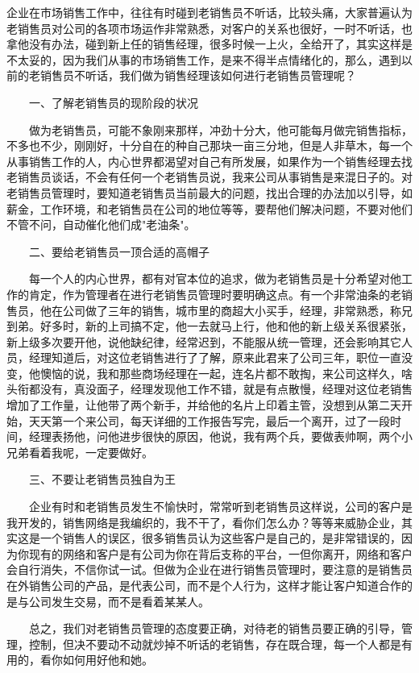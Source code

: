 
    企业在市场销售工作中，往往有时碰到老销售员不听话，比较头痛，大家普遍认为老销售员对公司的各项市场运作非常熟悉，对客户的关系也很好，一时不听话，也拿他没有办法，碰到新上任的销售经理，很多时候一上火，全给开了，其实这样是不太妥的，因为我们从事的市场销售工作，是来不得半点情绪化的，那么，遇到以前的老销售员不听话，我们做为销售经理该如何进行老销售员管理呢？

　　一、了解老销售员的现阶段的状况

　　做为老销售员，可能不象刚来那样，冲劲十分大，他可能每月做完销售指标，不多也不少，刚刚好，十分自在的种自己那块一亩三分地，但是人非草木，每一个从事销售工作的人，内心世界都渴望对自己有所发展，如果作为一个销售经理去找老销售员谈话，不会有任何一个老销售员说，我来公司从事销售是来混日子的。对老销售员管理时，要知道老销售员当前最大的问题，找出合理的办法加以引导，如薪金，工作环境，和老销售员在公司的地位等等，要帮他们解决问题，不要对他们不管不问，自动催化他们成"老油条"。

　　二、要给老销售员一顶合适的高帽子

　　每一个人的内心世界，都有对官本位的追求，做为老销售员是十分希望对他工作的肯定，作为管理者在进行老销售员管理时要明确这点。有一个非常油条的老销售员，他在公司做了三年的销售，城市里的商超大小买手，经理，非常熟悉，称兄到弟。好多时，新的上司搞不定，他一去就马上行，他和他的新上级关系很紧张，新上级多次要开他，说他缺纪律，经常迟到，不能服从统一管理，还会影响其它人员，经理知道后，对这位老销售进行了了解，原来此君来了公司三年，职位一直没变，他懊恼的说，我和那些商场经理在一起，连名片都不敢掏，来公司这样久，啥头衔都没有，真没面子，经理发现他工作不错，就是有点散慢，经理对这位老销售增加了工作量，让他带了两个新手，并给他的名片上印着主管，没想到从第二天开始，天天第一个来公司，每天详细的工作报告写完，最后一个离开，过了一段时间，经理表扬他，问他进步很快的原因，他说，我有两个兵，要做表帅啊，两个小兄弟看着我呢，一定要做好。

　　三、不要让老销售员独自为王

　　企业有时和老销售员发生不愉快时，常常听到老销售员这样说，公司的客户是我开发的，销售网络是我编织的，我不干了，看你们怎么办？等等来威胁企业，其实这是一个销售人的误区，很多销售员认为这些客户是自己的，是非常错误的，因为你现有的网络和客户是有公司为你在背后支称的平台，一但你离开，网络和客户会自行消失，不信你试一试。但做为企业在进行销售员管理时，要注意的是销售员在外销售公司的产品，是代表公司，而不是个人行为，这样才能让客户知道合作的是与公司发生交易，而不是看着某某人。

　　总之，我们对老销售员管理的态度要正确，对待老的销售员要正确的引导，管理，控制，但决不要动不动就炒掉不听话的老销售，存在既合理，每一个人都是有用的，看你如何用好他和她。
